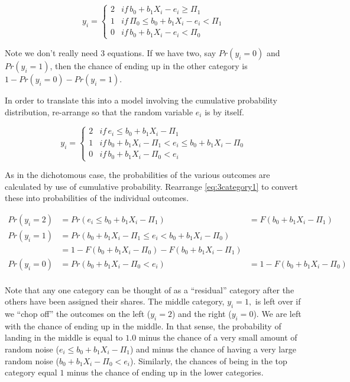 \begin{equation}
y_{i}=\left\{ \begin{array}{lll}
2 & if\,b_{0}+b_{1}X_{i}-e_{i}\geq\Pi_{1}\\
1 & if\,\Pi_{0}\leq b_{0}+b_{1}X_{i}-e_{i}<\Pi_{1}\\
0 & if\,b_{0}+b_{1}X_{i}-e_{i}<\Pi_{0}
\end{array}\right.\label{eq:3category1}
\end{equation}

Note we don't really need 3 equations. If we have two, say $Pr(y_{i}=0)$
and $Pr(y_{i}=1)$, then the chance of ending up in the other category
is $1-Pr(y_{i}=0)-Pr(y_{i}=1)$.

In order to translate this into a model involving the cumulative probability
distribution, re-arrange so that the random variable $e_{i}$ is by
itself.

\begin{equation}
y_{i}=\left\{ \begin{array}{lll}
2 & if\,e_{i}\leq b_{0}+b_{1}X_{i}-\Pi_{1}\\
1 & if\,b_{0}+b_{1}X_{i}-\Pi_{1}<e_{i}\leq b_{0}+b_{1}X_{i}-\Pi_{0}\\
0 & if\,b_{0}+b_{1}X_{i}-\Pi_{0}<e_{i}
\end{array}\right.\label{eq:3category2-1}
\end{equation}

As in the dichotomous case, the probabilities of the various outcomes
are calculated by use of cumulative probability. Rearrange \ref{eq:3category1}
to convert these into probabilities of the individual outcomes.

\begin{equation}
\begin{array}{lll}
Pr(y_{i}=2) & =Pr(e_{i}\leq b_{0}+b_{1}X_{i}-\Pi_{1}) & =F(b_{0}+b_{1}X_{i}-\Pi_{1})\\
Pr(y_{i}=1) & =Pr(b_{0}+b_{1}X_{i}-\Pi_{1}\leq e_{i}<b_{0}+b_{1}X_{i}-\Pi_{0})\\
 & =1-F(b_{0}+b_{1}X_{i}-\Pi_{0})-F(b_{0}+b_{1}X_{i}-\Pi_{1})\\
Pr(y_{i}=0) & =Pr(b_{0}+b_{1}X_{i}-\Pi_{0}<e_{i}) & =1-F(b_{0}+b_{1}X_{i}-\Pi_{0})
\end{array}\label{eq:3category2}
\end{equation}
\\
Note that any one category can be thought of as a ``residual'' category
after the others have been assigned their shares. The middle category,
$y_{i}=1,$ is left over if we ``chop off'' the outcomes on the
left ($y_{i}=2$) and the right ($y_{i}=0$). We are left with the
chance of ending up in the middle. In that sense, the probability
of landing in the middle is equal to $1.0$ minus the chance of a
very small amount of random noise ($e_{i}\leq b_{0}+b_{1}X_{i}-\Pi_{1}$)
and minus the chance of having a very large random noise ($b_{0}+b_{1}X_{i}-\Pi_{0}<e_{i}$).
Similarly, the chances of being in the top category equal $1$ minus
the chance of ending up in the lower categories.

